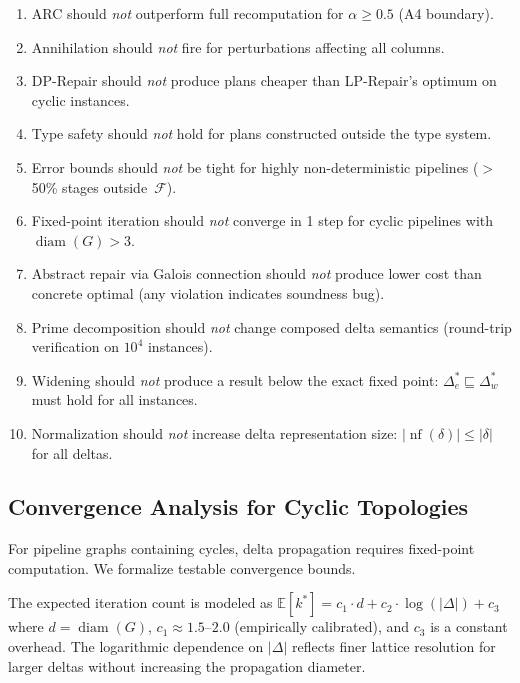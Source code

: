 \documentclass[11pt,a4paper]{article}
\theoremstyle{definition}
\newcommand{\FragF}{\mathcal{F}}
\DeclareMathOperator{\nf}{nf}
\DeclareMathOperator{\diam}{diam}
\begin{document}
\begin{enumerate}[label=\textbf{NC\arabic*},nosep]
  \item ARC should \emph{not} outperform full recomputation for $\alpha \geq 0.5$
    (A4 boundary).
  \item Annihilation should \emph{not} fire for perturbations affecting all columns.
  \item DP-Repair should \emph{not} produce plans cheaper than LP-Repair's
    optimum on cyclic instances.
  \item Type safety should \emph{not} hold for plans constructed outside the
    type system.
  \item Error bounds should \emph{not} be tight for highly non-deterministic
    pipelines ($>$50\% stages outside~$\FragF$).
  \item Fixed-point iteration should \emph{not} converge in 1 step for cyclic
    pipelines with $\diam(G) > 3$.
  \item Abstract repair via Galois connection should \emph{not} produce lower
    cost than concrete optimal (any violation indicates soundness bug).
  \item Prime decomposition should \emph{not} change composed delta semantics
    (round-trip verification on $10^4$ instances).
  \item Widening should \emph{not} produce a result below the exact fixed
    point: $\Delta_e^* \sqsubseteq \Delta_w^*$ must hold for all instances.
  \item Normalization should \emph{not} increase delta representation size:
    $|\nf(\delta)| \leq |\delta|$ for all deltas.
\end{enumerate}

\subsection{Convergence Analysis for Cyclic Topologies}
\label{sec:convergence-analysis}

For pipeline graphs containing cycles, delta propagation requires fixed-point
computation.  We formalize testable convergence bounds.

The expected iteration count is modeled as
$\mathbb{E}[k^*] = c_1 \cdot d + c_2 \cdot \log(|\Delta|) + c_3$
where $d = \diam(G)$, $c_1 \approx 1.5$--$2.0$ (empirically calibrated),
and $c_3$ is a constant overhead.  The logarithmic dependence on $|\Delta|$
reflects finer lattice resolution for larger deltas without increasing the
propagation diameter.
\end{document}
